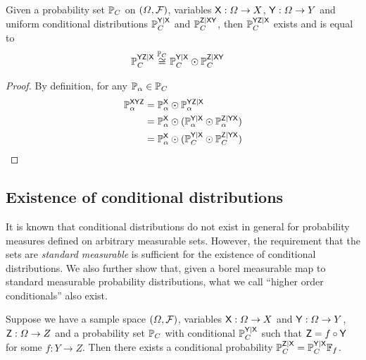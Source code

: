 \begin{theorem}\label{lem:joint_conditional}
Given a probability set $\mathbb{P}_C$ on $(\Omega,\mathcal{F})$, variables $\mathsf{X}:\Omega\to X$, $\mathsf{Y}:\Omega\to Y$ and uniform conditional distributions $\mathbb{P}_C^{\mathsf{Y}|\mathsf{X}}$ and $\mathbb{P}_C^{\mathsf{Z}|\mathsf{XY}}$, then $\mathbb{P}_C^{\mathsf{YZ}|\mathsf{X}}$ exists and is equal to
\begin{align}
    \mathbb{P}_C^{\mathsf{YZ}|\mathsf{X}} &\overset{\mathbb{P}_C}{\cong} \mathbb{P}_C^{\mathsf{Y}|\mathsf{X}}\odot \mathbb{P}_C^{\mathsf{Z}|\mathsf{XY}}
\end{align}
\end{theorem}

\begin{proof}
By definition, for any $\mathbb{P}_\alpha\in \mathbb{P}_C$
\begin{align}
    \mathbb{P}_\alpha^{\mathsf{XYZ}} &= \mathbb{P}_\alpha^{\mathsf{X}}\odot \mathbb{P}_\alpha^{\mathsf{YZ}|\mathsf{X}}\\
                               &= \mathbb{P}_\alpha^{\mathsf{X}}\odot(\mathbb{P}_\alpha^{\mathsf{Y}|\mathsf{X}}\odot \mathbb{P}_\alpha^{\mathsf{Z}|\mathsf{YX}})\\
                               &= \mathbb{P}_\alpha^{\mathsf{X}}\odot(\mathbb{P}_C^{\mathsf{Y}|\mathsf{X}}\odot \mathbb{P}_C^{\mathsf{Z}|\mathsf{YX}})
\end{align}
\end{proof}

\subsection{Existence of conditional distributions}

It is known that conditional distributions do not exist in general for probability measures defined on arbitrary measurable sets. However, the requirement that the sets are \emph{standard measurable} is sufficient for the existence of conditional distributions. We also further show that, given a borel measurable map to standard measurable probability distributions, what we call ``higher order conditionals'' also exist.

\begin{lemma}\label{th:recurs_pushf}
Suppose we have a sample space $(\Omega,\mathcal{F})$, variables $\mathsf{X}:\Omega\to X$ and $\mathsf{Y}:\Omega\to Y$, $\mathsf{Z}:\Omega\to Z$ and a probability set $\mathbb{P}_C$ with conditional $\mathbb{P}_C^{\mathsf{Y}|\mathsf{X}}$ such that $\mathsf{Z}=f\circ \mathsf{Y}$ for some $f:Y\to Z$. Then there exists a conditional probability $\mathbb{P}_C^{\mathsf{Z}|\mathsf{X}}=\mathbb{P}_C^{\mathsf{Y}|\mathsf{X}}\mathbb{F}_{f}$.
\end{lemma}

